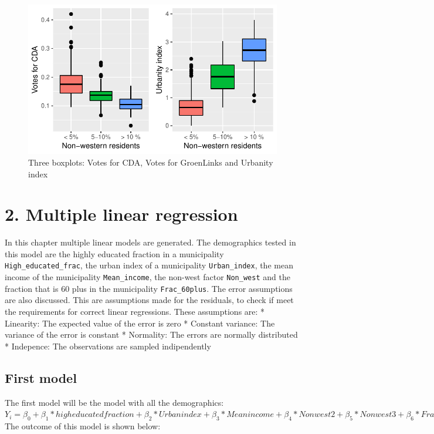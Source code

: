 \documentclass[11pt,]{article}
\begin{document}
\begin{figure}[H]

{\centering \includegraphics{Report_files/figure-latex/unnamed-chunk-8-1} 

}

\caption{\label{6}Three boxplots: Votes for CDA, Votes for GroenLinks and Urbanity index}\label{fig:unnamed-chunk-8}
\end{figure}

\section{2. Multiple linear
regression}\label{multiple-linear-regression}

In this chapter multiple linear models are generated. The demographics
tested in this model are the highly educated fraction in a municipality
\texttt{High\_educated\_frac}, the urban index of a municipality
\texttt{Urban\_index}, the mean income of the municipality
\texttt{Mean\_income}, the non-west factor \texttt{Non\_west} and the
fraction that is 60 plus in the municipality \texttt{Frac\_60plus}. The
error assumptions are also discussed. This are assumptions made for the
residuals, to check if meet the requirements for correct linear
regressions. These assumptions are: * Linearity: The expected value of
the error is zero * Constant variance: The variance of the error is
constant * Normality: The errors are normally distributed * Indepence:
The observations are sampled indipendently

\subsection{First model}\label{first-model}

The first model will be the model with all the demographics:\\
\(Y_i = \beta_0 + \beta_1*high educated fraction + \beta_2*Urban index + \beta_3*Mean income + \beta_4*Non west2 +\beta_5*Non west3 + \beta_6*Frac 60plus + \epsilon i\)\\
The outcome of this model is shown below:
\end{document}
